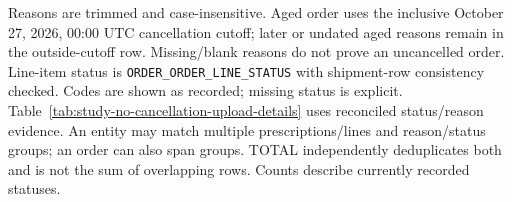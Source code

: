 \begin{landscape}
\begin{table}[!htbp]
\begin{minipage}{\linewidth}
Reasons are trimmed and case-insensitive. Aged order uses the inclusive
October 27, 2026, 00:00 UTC cancellation cutoff; later or undated aged reasons
remain in the outside-cutoff row. Missing/blank reasons do not prove an uncancelled
order. Line-item status is \texttt{ORDER\_ORDER\_LINE\_STATUS} with shipment-row consistency checked.
Codes are shown as recorded; missing status is explicit. Table~\ref{tab:study-no-cancellation-upload-details}
uses reconciled status/reason evidence.
An entity may match multiple prescriptions/lines and reason/status groups;
an order can also span groups. TOTAL independently deduplicates both and is not
the sum of overlapping rows. Counts describe currently recorded statuses.
\end{minipage}
\end{table}
\end{landscape}

\clearpage
